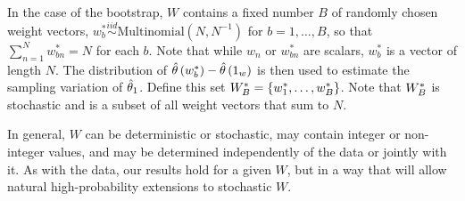 In the case of the bootstrap, $W$ contains a fixed number $B$ of randomly chosen
weight vectors,
$w_{b}^{*}\stackrel{iid}{\sim}\mathrm{Multinomial}\left(N,N^{-1}\right)$ for
$b=1, \ldots, B$, so that $\sum_{n=1}^N w_{bn}^{*} = N$ for each $b$. Note that
while $w_n$ or $w_{bn}^{*}$ are scalars, $w_{b}^{*}$ is a vector of length $N$.
The distribution of
$\hat{\theta}\left(w_{b}^{*}\right)-\hat{\theta}\left(1_{w}\right)$ is then used to
estimate the sampling variation of $\hat{\theta}_{1}$. Define this set $W^*_B =
\{w_{1}^{*},\ldots,w_{B}^{*}\}$.  Note that $W^*_B$ is stochastic and is a
subset of all weight vectors that sum to $N$.

In general, $W$ can be deterministic or stochastic, may contain integer or
non-integer values, and may be determined independently of the data or jointly
with it. As with the data, our results hold for a given $W$, but in a way that
will allow natural high-probability extensions to stochastic $W$.
